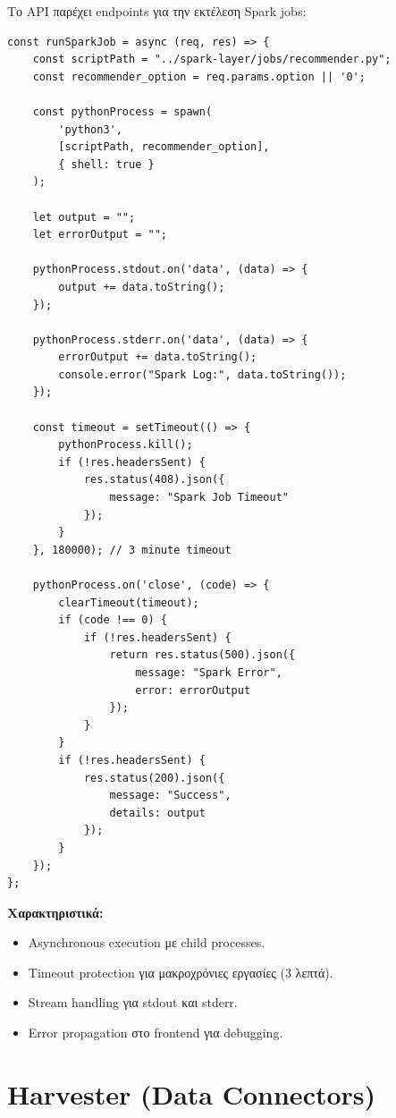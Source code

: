 \documentclass[a4paper,12pt]{article}
\begin{document}
Το API παρέχει endpoints για την εκτέλεση Spark jobs:

\begin{verbatim}
const runSparkJob = async (req, res) => {
    const scriptPath = "../spark-layer/jobs/recommender.py";
    const recommender_option = req.params.option || '0';

    const pythonProcess = spawn(
        'python3', 
        [scriptPath, recommender_option], 
        { shell: true }
    );

    let output = "";
    let errorOutput = "";

    pythonProcess.stdout.on('data', (data) => {
        output += data.toString();
    });

    pythonProcess.stderr.on('data', (data) => {
        errorOutput += data.toString();
        console.error("Spark Log:", data.toString());
    });

    const timeout = setTimeout(() => {
        pythonProcess.kill();
        if (!res.headersSent) {
            res.status(408).json({ 
                message: "Spark Job Timeout" 
            });
        }
    }, 180000); // 3 minute timeout

    pythonProcess.on('close', (code) => {
        clearTimeout(timeout);
        if (code !== 0) {
            if (!res.headersSent) {
                return res.status(500).json({ 
                    message: "Spark Error", 
                    error: errorOutput 
                });
            }
        }
        if (!res.headersSent) {
            res.status(200).json({ 
                message: "Success", 
                details: output 
            });
        }
    });
};
\end{verbatim}

\textbf{Χαρακτηριστικά:}
\begin{itemize}
    \item Asynchronous execution με child processes.
    \item Timeout protection για μακροχρόνιες εργασίες (3 λεπτά).
    \item Stream handling για stdout και stderr.
    \item Error propagation στο frontend για debugging.
\end{itemize}

\section{Harvester (Data Connectors)}
\end{document}
